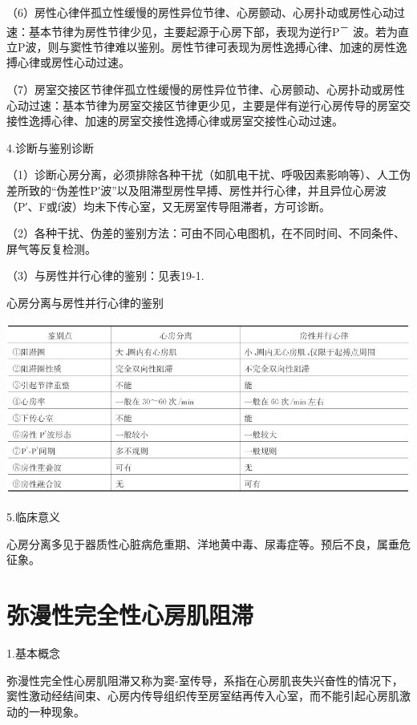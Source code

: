 （6）房性心律伴孤立性缓慢的房性异位节律、心房颤动、心房扑动或房性心动过速：基本节律为房性节律少见，主要起源于心房下部，表现为逆行P\textsuperscript{－}
波。若为直立P波，则与窦性节律难以鉴别。房性节律可表现为房性逸搏心律、加速的房性逸搏心律或房性心动过速。

（7）房室交接区节律伴孤立性缓慢的房性异位节律、心房颤动、心房扑动或房性心动过速：基本节律为房室交接区节律更少见，主要是伴有逆行心房传导的房室交接性逸搏心律、加速的房室交接性逸搏心律或房室交接性心动过速。

4.诊断与鉴别诊断

（1）诊断心房分离，必须排除各种干扰（如肌电干扰、呼吸因素影响等）、人工伪差所致的“伪差性P′波”以及阻滞型房性早搏、房性并行心律，并且异位心房波（P′、F或f波）均未下传心室，又无房室传导阻滞者，方可诊断。

（2）各种干扰、伪差的鉴别方法：可由不同心电图机，在不同时间、不同条件、屏气等反复检测。

（3）与房性并行心律的鉴别：见表19-1.

\begin{table}[htbp]
\centering
\caption{心房分离与房性并行心律的鉴别}
\label{tab19-1}
\includegraphics[width=5.44792in,height=2.23958in]{./images/Image00329.jpg}
\end{table}

5.临床意义

心房分离多见于器质性心脏病危重期、洋地黄中毒、尿毒症等。预后不良，属垂危征象。

\protect\hypertarget{text00026.htmlux5cux23subid322}{}{}

\section{弥漫性完全性心房肌阻滞}

1.基本概念

弥漫性完全性心房肌阻滞又称为窦-室传导，系指在心房肌丧失兴奋性的情况下，窦性激动经结间束、心房内传导组织传至房室结再传入心室，而不能引起心房肌激动的一种现象。


